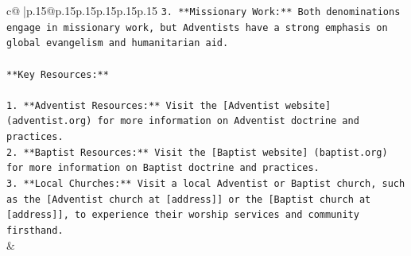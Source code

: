 \documentclass{article}
\begin{document}
{\begin{supertabular}{c@{$\;$}|p{.15\linewidth}@{}p{.15\linewidth}p{.15\linewidth}p{.15\linewidth}p{.15\linewidth}p{.15\linewidth}}
{{{\texttt{3. **Missionary Work:** Both denominations engage in missionary work, but Adventists have a strong emphasis on global evangelism and humanitarian aid.} \\
\\ 
\texttt{**Key Resources:**} \\
\\ 
\texttt{1. **Adventist Resources:** Visit the {[}Adventist website{]} (adventist.org) for more information on Adventist doctrine and practices.} \\
\texttt{2. **Baptist Resources:** Visit the {[}Baptist website{]} (baptist.org) for more information on Baptist doctrine and practices.} \\
\texttt{3. **Local Churches:** Visit a local Adventist or Baptist church, such as the {[}Adventist church at {[}address{]}{]} or the {[}Baptist church at {[}address{]}{]}, to experience their worship services and community firsthand.} \\
            }
        }
    }
    & \\ \\


\end{supertabular}}
\end{document}
